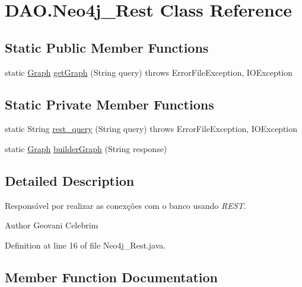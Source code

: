 \hypertarget{classDAO_1_1Neo4j__Rest}{}\section{D\+A\+O.\+Neo4j\+\_\+\+Rest Class Reference}
\label{classDAO_1_1Neo4j__Rest}
\subsection*{Static Public Member Functions}
\begin{DoxyCompactItemize}
\item 
static \hyperlink{classentidade_1_1Graph}{Graph} \hyperlink{classDAO_1_1Neo4j__Rest_ad77ecb3b275019e3186dbdd34dcedc6c}{get\+Graph} (String query)  throws Error\+File\+Exception, I\+O\+Exception 
\end{DoxyCompactItemize}
\subsection*{Static Private Member Functions}
\begin{DoxyCompactItemize}
\item 
static String \hyperlink{classDAO_1_1Neo4j__Rest_a6a3baef27da288379f39b90c7ca8b0a7}{rest\+\_\+query} (String query)  throws Error\+File\+Exception, 			\+I\+O\+Exception 
\item 
static \hyperlink{classentidade_1_1Graph}{Graph} \hyperlink{classDAO_1_1Neo4j__Rest_ac62f85a4a1155d1e2fa59d463530b722}{builder\+Graph} (String response)
\end{DoxyCompactItemize}


\subsection{Detailed Description}
Responsável por realizar as conexções com o banco usando {\itshape R\+E\+ST}.

\begin{DoxyAuthor}{Author}
Geovani Celebrim 
\end{DoxyAuthor}


Definition at line 16 of file Neo4j\+\_\+\+Rest.\+java.



\subsection{Member Function Documentation}
\hypertarget{classDAO_1_1Neo4j__Rest_ac62f85a4a1155d1e2fa59d463530b722}{}\label{classDAO_1_1Neo4j__Rest_ac62f85a4a1155d1e2fa59d463530b722} 
